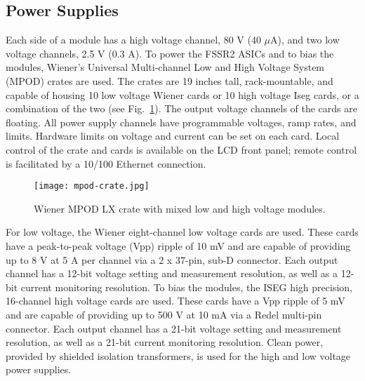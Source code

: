 \subsection{Power Supplies}

Each side of a module has a high voltage channel, 80 V (40 $\mu$A), and two low voltage channels, 2.5 V (0.3 A). To power the FSSR2 ASICs and to bias the modules, Wiener's Universal Multi-channel Low and High Voltage System (MPOD) crates are used. The crates are 19 inches tall, rack-mountable, and capable of housing 10 low voltage Wiener cards or 10 high voltage Iseg cards, or a combination of the two (see Fig.~\ref{fig:mpod-crate}). The output voltage channels of the cards are floating. All power supply channels have programmable voltages, ramp rates, and limits. Hardware limits on voltage and current can be set on each card. Local control of the crate and cards is available on the LCD front panel; remote control is facilitated by a 10/100 Ethernet connection. 

\begin{figure}[hbt] 
\centering 
\texttt{[image: mpod-crate.jpg]}
\caption{Wiener MPOD LX crate with mixed low and high voltage modules.}
\label{fig:mpod-crate}
\end{figure}

For low voltage, the Wiener eight-channel low voltage cards are used. These cards have a peak-to-peak voltage (Vpp) ripple of 10 mV and are capable of providing up to 8 V at 5 A per channel via a 2 x 37-pin, sub-D connector. Each output channel has a 12-bit voltage setting and measurement resolution, as well as a 12-bit current monitoring resolution. To bias the modules, the ISEG high precision, 16-channel high voltage cards are used. These cards have a Vpp ripple of 5 mV and are capable of providing up to 500 V at 10 mA via a Redel multi-pin connector. Each output channel has a 21-bit voltage setting and measurement resolution, as well as a 21-bit current monitoring resolution. Clean power, provided by shielded isolation transformers, is used for the high and low voltage power supplies.

